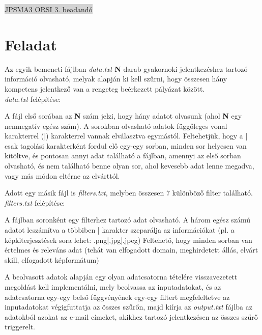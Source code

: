 \documentclass[12pt]{article}
\begin{document}
\thispagestyle{empty}
\begin{center}
	\colorbox{lightgray}{{\large JPSMA3} \hspace{4.3cm} {\large ORSI 3. beadandó} \hspace{5.7cm} \thepage}
\end{center}
\section{Feladat}


Az egyik bemeneti fájlban \textit{data.txt} \textbf{N} darab gyakornoki jelentkezéshez tartozó
információ olvasható, melyak alapján ki kell szűrni, hogy összesen hány kompetens jelentkező
van a rengeteg beérkezett pályázat között.\\[0.2cm]
\textit{data.txt} felépítése:

A fájl első sorában az \textbf{N} szám jelzi, hogy hány adatot olvasunk (ahol \textbf{N} egy nemnegatív egész szám).
A sorokban olvasható adatok függőleges vonal karakterrel (|) karakterrel vannak elválasztva egymástól.
Feltehetjük, hogy a | csak tagolási karakterként fordul elő egy-egy sorban, minden sor
helyesen van kitöltve, és pontosan annyi adat található a fájlban, amennyi az első sorban
olvasható, és nem található benne olyan sor, ahol kevesebb adat lenne megadva, vagy más módon
eltérne az elvárttól.

Adott egy másik fájl is \textit{filters.txt}, melyben összesen 7 különböző filter található.\\
\textit{filters.txt} felépítése:

A fájlban soronként egy filterhez tartozó adat olvasható. A három egész számú adatot
leszámítva a többiben | karakter szeparálja az információkat (pl. a képkiterjesztések sora
lehet: .png|.jpg|.jpeg) Feltehető, hogy minden sorban van értelmes és releváns adat (tehát
van elfogadott domain, meghirdetett állás, elvárt skill, elfogadott képformátum)

A beolvasott adatok alapján egy olyan adatcsatorna tételére visszavezetett megoldást kell
implementálni, mely beolvassa az inputadatokat, és az adatcsatorna egy-egy belső függvényének
egy-egy filtert megfeleltetve az inputadatokat végigfuttatja az összes szűrőn, majd kiírja az
\textit{output.txt} fájlba az adatokból azokat az e-mail címeket, akikhez tartozó
jelentkezésen az összes szűrő triggerelt.
\end{document}
